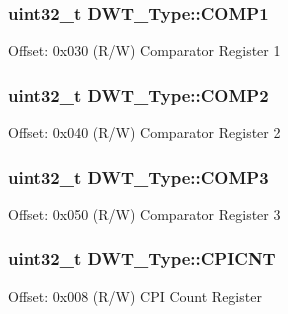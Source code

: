 \subsubsection[{\texorpdfstring{C\+O\+M\+P1}{COMP1}}]{ uint32\+\_\+t D\+W\+T\+\_\+\+Type\+::\+C\+O\+M\+P1}\hypertarget{struct_d_w_t___type_a4a5bb70a5ce3752bd628d5ce5658cb0c}{}\label{struct_d_w_t___type_a4a5bb70a5ce3752bd628d5ce5658cb0c}
Offset\+: 0x030 (R/W) Comparator Register 1 
\subsubsection[{\texorpdfstring{C\+O\+M\+P2}{COMP2}}]{ uint32\+\_\+t D\+W\+T\+\_\+\+Type\+::\+C\+O\+M\+P2}\hypertarget{struct_d_w_t___type_a8927aedbe9fd6bdae8983088efc83332}{}\label{struct_d_w_t___type_a8927aedbe9fd6bdae8983088efc83332}
Offset\+: 0x040 (R/W) Comparator Register 2 
\subsubsection[{\texorpdfstring{C\+O\+M\+P3}{COMP3}}]{ uint32\+\_\+t D\+W\+T\+\_\+\+Type\+::\+C\+O\+M\+P3}\hypertarget{struct_d_w_t___type_a3df15697eec279dbbb4b4e9d9ae8b62f}{}\label{struct_d_w_t___type_a3df15697eec279dbbb4b4e9d9ae8b62f}
Offset\+: 0x050 (R/W) Comparator Register 3 
\subsubsection[{\texorpdfstring{C\+P\+I\+C\+NT}{CPICNT}}]{ uint32\+\_\+t D\+W\+T\+\_\+\+Type\+::\+C\+P\+I\+C\+NT}\hypertarget{struct_d_w_t___type_a88cca2ab8eb1b5b507817656ceed89fc}{}\label{struct_d_w_t___type_a88cca2ab8eb1b5b507817656ceed89fc}
Offset\+: 0x008 (R/W) C\+PI Count Register 
